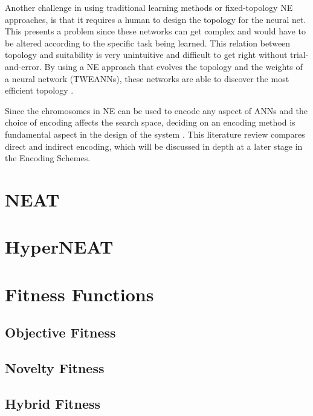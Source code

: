 Another challenge in using traditional learning methods or fixed-topology NE approaches, is that it requires a human to design the topology for the neural net. This presents a problem since these networks can get complex and would have to be altered according to the specific task being learned. This relation between topology and suitability is very unintuitive and difficult to get right without trial-and-error. By using a NE approach that evolves the topology and the weights of a neural network (TWEANNs), these networks are able to discover the most efficient topology \cite{RefWorks:31}.

Since the chromosomes in NE can be used to encode any aspect of ANNs and the choice of encoding affects the search space, deciding on an encoding method is fundamental aspect in the design of the system \cite{RefWorks:31}. This literature review compares direct and indirect encoding, which will be discussed in depth at a later stage in the Encoding Schemes.


\section{NEAT}

\section{HyperNEAT}




\section{Fitness Functions}

\subsection{Objective Fitness}
\subsection{Novelty Fitness}
\subsection{Hybrid Fitness}




